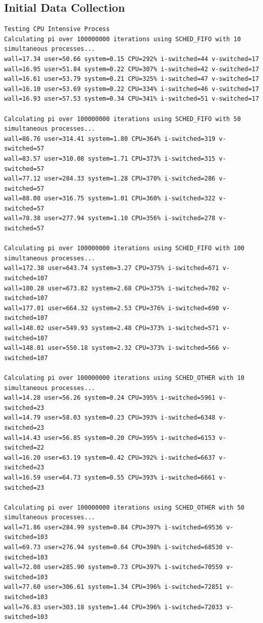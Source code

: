 \documentclass[12pt]{article}
\begin{document}
\subsection{Initial Data Collection}
\begin{small}
\begin{verbatim}
Testing CPU Intensive Process
Calculating pi over 100000000 iterations using SCHED_FIFO with 10 simultaneous processes...
wall=17.34 user=50.66 system=0.15 CPU=292% i-switched=44 v-switched=17
wall=16.95 user=51.84 system=0.22 CPU=307% i-switched=42 v-switched=17
wall=16.61 user=53.79 system=0.21 CPU=325% i-switched=47 v-switched=17
wall=16.10 user=53.69 system=0.22 CPU=334% i-switched=46 v-switched=17
wall=16.93 user=57.53 system=0.34 CPU=341% i-switched=51 v-switched=17

Calculating pi over 100000000 iterations using SCHED_FIFO with 50 simultaneous processes...
wall=86.76 user=314.41 system=1.80 CPU=364% i-switched=319 v-switched=57
wall=83.57 user=310.08 system=1.71 CPU=373% i-switched=315 v-switched=57
wall=77.12 user=284.33 system=1.28 CPU=370% i-switched=286 v-switched=57
wall=88.08 user=316.75 system=1.01 CPU=360% i-switched=322 v-switched=57
wall=78.38 user=277.94 system=1.10 CPU=356% i-switched=278 v-switched=57

Calculating pi over 100000000 iterations using SCHED_FIFO with 100 simultaneous processes...
wall=172.38 user=643.74 system=3.27 CPU=375% i-switched=671 v-switched=107
wall=180.28 user=673.82 system=2.68 CPU=375% i-switched=702 v-switched=107
wall=177.01 user=664.32 system=2.53 CPU=376% i-switched=690 v-switched=107
wall=148.02 user=549.93 system=2.48 CPU=373% i-switched=571 v-switched=107
wall=148.01 user=550.18 system=2.32 CPU=373% i-switched=566 v-switched=107

Calculating pi over 100000000 iterations using SCHED_OTHER with 10 simultaneous processes...
wall=14.28 user=56.26 system=0.24 CPU=395% i-switched=5961 v-switched=23
wall=14.79 user=58.03 system=0.23 CPU=393% i-switched=6348 v-switched=23
wall=14.43 user=56.85 system=0.20 CPU=395% i-switched=6153 v-switched=22
wall=16.20 user=63.19 system=0.42 CPU=392% i-switched=6637 v-switched=23
wall=16.59 user=64.73 system=0.55 CPU=393% i-switched=6661 v-switched=23

Calculating pi over 100000000 iterations using SCHED_OTHER with 50 simultaneous processes...
wall=71.86 user=284.99 system=0.84 CPU=397% i-switched=69536 v-switched=103
wall=69.73 user=276.94 system=0.64 CPU=398% i-switched=68530 v-switched=103
wall=72.08 user=285.90 system=0.73 CPU=397% i-switched=70559 v-switched=103
wall=77.60 user=306.61 system=1.34 CPU=396% i-switched=72851 v-switched=103
wall=76.83 user=303.18 system=1.44 CPU=396% i-switched=72033 v-switched=103


\end{verbatim}
\end{small}
\end{document}
